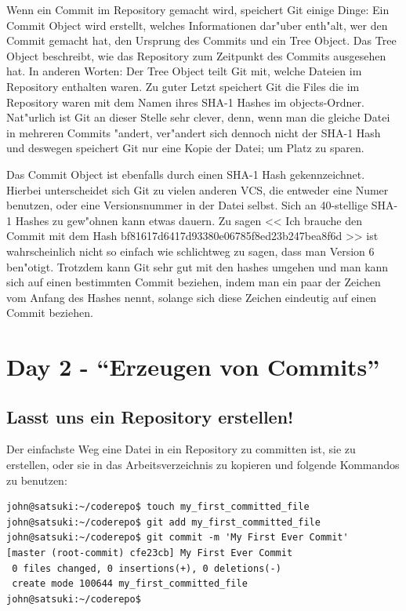 Wenn ein Commit im Repository gemacht wird, speichert Git einige Dinge: Ein Commit Object wird erstellt, welches Informationen dar"uber enth"alt, wer den Commit gemacht hat, den Ursprung des Commits und ein Tree Object. Das Tree Object beschreibt, wie das Repository zum Zeitpunkt des Commits ausgesehen hat. In anderen Worten: Der Tree Object teilt Git mit, welche Dateien im Repository enthalten waren. Zu guter Letzt speichert Git die Files die im Repository waren mit dem Namen ihres SHA-1 Hashes im objects-Ordner. Nat"urlich ist Git an dieser Stelle sehr clever, denn, wenn man die gleiche Datei in mehreren Commits "andert, ver"andert sich dennoch nicht der SHA-1 Hash und deswegen speichert Git nur eine Kopie der Datei; um Platz zu sparen. 

Das Commit Object ist ebenfalls durch einen SHA-1 Hash gekennzeichnet. Hierbei unterscheidet sich Git zu vielen anderen VCS, die entweder eine Numer benutzen, oder eine Versionsnummer in der Datei selbst. Sich an 40-stellige SHA-1 Hashes zu gew"ohnen kann etwas dauern. Zu sagen << Ich brauche den Commit mit dem Hash bf81617d6417d93380e06785f8ed23b247bea8f6d >> ist wahrscheinlich nicht so einfach wie schlichtweg zu sagen, dass man Version 6 ben"otigt. Trotzdem kann Git sehr gut mit den hashes umgehen und man kann sich auf einen bestimmten Commit beziehen, indem man ein paar der Zeichen vom Anfang des Hashes nennt, solange sich diese Zeichen eindeutig auf einen Commit beziehen.

\section{Day 2 - ``Erzeugen von Commits''}
\subsection{Lasst uns ein Repository erstellen!}

Der einfachste Weg eine Datei in ein Repository zu committen ist, sie zu erstellen, oder sie in das Arbeitsverzeichnis zu kopieren und folgende Kommandos zu benutzen:

\begin{Verbatim}
john@satsuki:~/coderepo$ touch my_first_committed_file
john@satsuki:~/coderepo$ git add my_first_committed_file
john@satsuki:~/coderepo$ git commit -m 'My First Ever Commit'
[master (root-commit) cfe23cb] My First Ever Commit
 0 files changed, 0 insertions(+), 0 deletions(-)
 create mode 100644 my_first_committed_file
john@satsuki:~/coderepo$ 
\end{Verbatim} 

